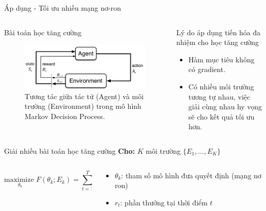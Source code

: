 \begin{frame}{Áp dụng - Tối ưu nhiều mạng nơ-ron}
    \begin{columns}
        \begin{column}{0.48\textwidth}
            \begin{block}{Bài toán học tăng cường}
                \begin{figure}
                    \centering
                    \includegraphics[width=0.7\linewidth]{figure/propose/mdp.png}
                    \caption{Tương tác giữa tác tử (Agent) và môi trường (Environment) trong mô hình Markov Decision Process.}
                    \label{fig:propose:mdp}
                \end{figure}
            \end{block}
        \end{column}
        \begin{column}{0.48\textwidth}
            \begin{block}{Lý do áp dụng tiến hóa đa nhiệm cho học tăng cường}
                \begin{itemize}
                    \item Hàm mục tiêu không có gradient.
                    \item Có nhiều môi trường tương tự nhau, việc giải cùng nhau hy vọng sẽ cho kết quả tối ưu hơn.
                \end{itemize}
            \end{block}
        \end{column}
    \end{columns}
    \begin{alertblock}{Giải nhiều bài toán học tăng cường}
        \textbf{Cho:} $K$ môi trường $\{E_1, \ldots, E_K\}$
        \begin{columns}
            \begin{column}{0.48\textwidth}
                \begin{equation}
                    \underset{\theta_k}{\text{maximize }} F(\theta_k; E_k) = \sum_{t=1}^{T} r_t
                \end{equation}
            \end{column}
            \begin{column}{0.48\textwidth}
                \begin{itemize}
                    \item $\theta_k$: tham số mô hình đưa quyết định (mạng nơ ron) 
                    \item $r_t$: phần thưởng tại thời điểm $t$
                \end{itemize}
            \end{column}
        \end{columns}
    \end{alertblock}
\end{frame}

